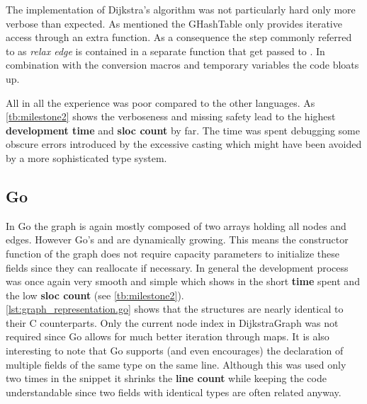 The implementation of Dijkstra's algorithm was not particularly hard only more verbose than expected. As mentioned the GHashTable only provides iterative access through an extra function. As a consequence the step commonly referred to as \textit{relax edge} is contained in a separate function that get passed to . In combination with the conversion macros and temporary variables the code bloats up.

All in all the experience was poor compared to the other languages. As \autoref{tb:milestone2} shows the verboseness and missing safety lead to the highest \textbf{development time} and \textbf{\gls{sloc} count} by far. The time was spent debugging some obscure errors introduced by the excessive casting which might have been avoided by a more sophisticated type system.

\subsection{Go}
\label{subsec:Implementation::Graph_Representation::Go}

In Go the graph is again mostly composed of two arrays holding all nodes and edges. However Go's  and  are dynamically growing. This means the constructor function of the graph does not require capacity parameters to initialize these fields since they can reallocate if necessary. In general the development process was once again very smooth and simple which shows in the short \textbf{time} spent and the low \textbf{\gls{sloc} count} (see \autoref{tb:milestone2}).
\\


\autoref{lst:graph_representation.go} shows that the structures are nearly identical to their C counterparts. Only the current node index in DijkstraGraph was not required since Go allows for much better iteration through maps. It is also interesting to note that Go supports (and even encourages) the declaration of multiple fields of the same type on the same line. Although this was used only two times in the snippet it shrinks the \textbf{line count} while keeping the code understandable since two fields with identical types are often related anyway.

